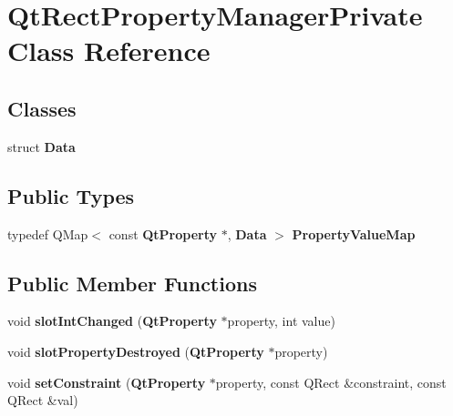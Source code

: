 \section{Qt\+Rect\+Property\+Manager\+Private Class Reference}
\label{classQtRectPropertyManagerPrivate}
\subsection*{Classes}
\begin{DoxyCompactItemize}
\item 
struct {\bf Data}
\end{DoxyCompactItemize}
\subsection*{Public Types}
\begin{DoxyCompactItemize}
\item 
typedef Q\+Map$<$ const {\bf Qt\+Property} $\ast$, {\bf Data} $>$ {\bf Property\+Value\+Map}
\end{DoxyCompactItemize}
\subsection*{Public Member Functions}
\begin{DoxyCompactItemize}
\item 
void {\bf slot\+Int\+Changed} ({\bf Qt\+Property} $\ast$property, int value)
\item 
void {\bf slot\+Property\+Destroyed} ({\bf Qt\+Property} $\ast$property)
\item 
void {\bf set\+Constraint} ({\bf Qt\+Property} $\ast$property, const Q\+Rect \&constraint, const Q\+Rect \&val)
\end{DoxyCompactItemize}
